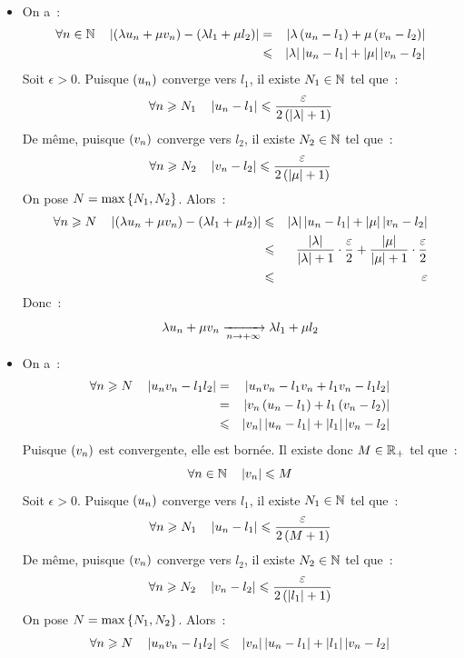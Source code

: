 \documentclass{magnoliaold}
\begin{document}
\begin{preuve}
$\quad$
\begin{itemize}
\item On a~:
  \begin{eqnarray*}
  \forall n\in\mathbb{N} \quad \left|\left(\lambda u_n+ \mu v_n\right)-\left(\lambda l_1+\mu l_2\right)\right|
  &=& \left|\lambda\left(u_n-l_1\right)+\mu\left(v_n-l_2\right)\right|\\
  &\leqslant& \left|\lambda\right|\left|u_n-l_1\right| + \left|\mu\right|\left|v_n-l_2\right|
  \end{eqnarray*}
  Soit $\epsilon>0$. Puisque $\left(u_n\right)$ converge vers $l_1$, il existe $N_1\in\mathbb{N}$
  tel que~:
  \[\forall n\geqslant N_1 \quad \left|u_n-l_1\right|\leqslant
    \frac{\varepsilon}{2\left(\left|\lambda\right|+1\right)}\]
  De même, puisque $\left(v_n\right)$ converge vers $l_2$, il existe $N_2\in\mathbb{N}$ tel que~:
  \[\forall n\geqslant N_2 \quad \left|v_n-l_2\right|\leqslant
    \frac{\varepsilon}{2\left(\left|\mu\right|+1\right)}\]
  On pose $N=\max\left\{N_1,N_2\right\}$. Alors~:
  \begin{eqnarray*}
  \forall n\geqslant N \quad \left|\left(\lambda u_n+ \mu v_n\right)-\left(\lambda l_1+\mu l_2\right)\right|
  &\leqslant& \left|\lambda\right|\left|u_n-l_1\right| + \left|\mu\right|\left|v_n-l_2\right|\\
  &\leqslant& \frac{\left|\lambda\right|}{\left|\lambda\right|+1}\cdot\frac{\varepsilon}{2}+
         \frac{\left|\mu\right|}{\left|\mu\right|+1}\cdot\frac{\varepsilon}{2}\\
  &\leqslant& \varepsilon
  \end{eqnarray*}
  Donc~:
  \[\lambda u_n+\mu v_n \xrightarrow[n\rightarrow +\infty]{} \lambda l_1+\mu l_2\]
\item On a~:
  \begin{eqnarray*}
  \forall n\geqslant N \quad \left|u_n v_n - l_1 l_2\right|
  &=& \left|u_n v_n - l_1 v_n + l_1 v_n - l_1 l_2\right|\\
  &=& \left|v_n\left(u_n-l_1\right)+l_1\left(v_n-l_2\right)\right|\\
  &\leqslant& \left|v_n\right|\left|u_n-l_1\right|+\left|l_1\right|\left|v_n-l_2\right|
  \end{eqnarray*}
  Puisque $\left(v_n\right)$ est convergente, elle est bornée. Il existe donc
  $M\in\mathbb{R}_+$ tel que~:
  \[\forall n\in\mathbb{N} \quad \left|v_n\right|\leqslant M\]
  Soit $\epsilon>0$. Puisque $\left(u_n\right)$ converge vers $l_1$, il existe $N_1\in\mathbb{N}$
  tel que~:
  \[\forall n\geqslant N_1 \quad \left|u_n-l_1\right|\leqslant\frac{\varepsilon}{2\left(M+1\right)}\]
  De même, puisque $\left(v_n\right)$ converge vers $l_2$, il existe $N_2\in\mathbb{N}$ tel que~:
  \[\forall n\geqslant N_2 \quad \left|v_n-l_2\right|\leqslant\frac{\varepsilon}{2\left(\left|l_1\right|+1\right)}\]
  On pose $N=\max\left\{N_1,N_2\right\}$. Alors~:
  \begin{eqnarray*}
  \forall n\geq N \quad \abs{u_n v_n - l_1 l_2}
  &\leq& \abs{v_n}\abs{u_n-l_1}+\abs{l_1}\abs{v_n-l_2}\\

\end{eqnarray*}
\end{itemize}
\end{preuve}
\end{document}
